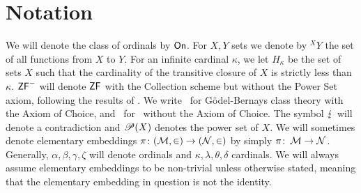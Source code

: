 \documentclass[../main]{subfiles}
\begin{document}
\chapter{Notation}
\thispagestyle{fancy}

\setlength{\parindent}{18pt}
\begin{onehalfspacing}

We will denote the class of ordinals by $\textsf{On}$. For $X,Y$ sets we denote by ${^X}Y$ the set of all functions from $X$ to $Y$. For an infinite cardinal $\kappa$, we let $H_\kappa$ be the set of sets $X$ such that the cardinality of the transitive closure of $X$ is strictly less than $\kappa$. $\textsf{ZF}^-$ will denote $\textsf{ZF}$ with the Collection scheme but without the Power Set axiom, following the results of \cite{ZFwithoutPowerSet}. We write \gbc\ for G\"odel-Bernays class theory with the Axiom of Choice, and \gb\ for \gbc\ without the Axiom of Choice. The symbol $\operatorname{\lightning}$ will denote a contradiction and $\mathscr P(X)$ denotes the power set of $X$. We will sometimes denote elementary embeddings $\pi\colon(\operatorname{\mathcal M},\in)\to(\operatorname{\mathcal N},\in)$ by simply $\pi\colon\operatorname{\mathcal M}\to\operatorname{\mathcal N}$. Generally, $\alpha,\beta,\gamma,\zeta$ will denote ordinals and $\kappa,\lambda,\theta,\delta$ cardinals. We will always assume elementary embeddings to be non-trivial unless otherwise stated, meaning that the elementary embedding in question is not the identity.


\end{onehalfspacing}
\setlength{\parindent}{0pt}
\end{document}

